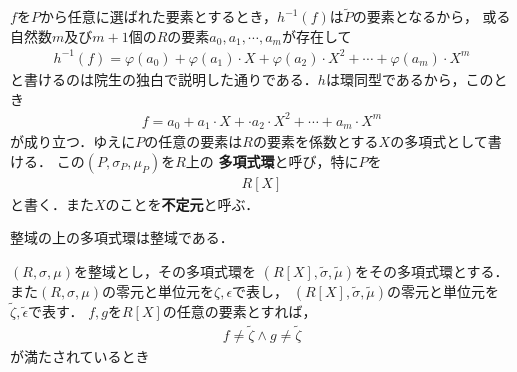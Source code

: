 	$f$を$P$から任意に選ばれた要素とするとき，$h^{-1}(f)$は$\tilde{P}$の要素となるから，
	或る自然数$m$及び$m+1$個の$R$の要素$a_0,a_1,\cdots,a_m$が存在して
	\begin{align}
		h^{-1}(f) = \varphi(a_0) + \varphi(a_1) \cdot X + \varphi(a_2) \cdot X^2 + \cdots + \varphi(a_m) \cdot X^m
	\end{align}
	と書けるのは院生の独白で説明した通りである．$h$は環同型であるから，このとき
	\begin{align}
		f = a_0 + a_1 \cdot X + \cdot a_2 \cdot X^2 + \cdots + a_m \cdot X^m
	\end{align}
	が成り立つ．ゆえに$P$の任意の要素は$R$の要素を係数とする$X$の多項式として書ける．
	この$(P,\sigma_P,\mu_P)$を$R$上の
	{\bf 多項式環}と呼び，特に$P$を
	\begin{align}
		R[X]
	\end{align}
	と書く．また$X$のことを{\bf 不定元}と呼ぶ．
	
	
	\begin{screen}
		\begin{thm}[整域上の多項式環は整域]
			整域の上の多項式環は整域である．
		\end{thm}
	\end{screen}
	
	\begin{prf}
		$(R,\sigma,\mu)$を整域とし，その多項式環を
		$\left( R[X],\tilde{\sigma},\tilde{\mu} \right)$をその多項式環とする．
		また$(R,\sigma,\mu)$の零元と単位元を$\zeta,\epsilon$で表し，
		$\left( R[X],\tilde{\sigma},\tilde{\mu} \right)$の零元と単位元を
		$\tilde{\zeta},\tilde{\epsilon}$で表す．
		$f,g$を$R[X]$の任意の要素とすれば，
		\begin{align}
			f \neq \tilde{\zeta} \wedge g \neq \tilde{\zeta}
		\end{align}
		が満たされているとき
		
		
	\end{prf}
	
	\begin{screen}
		\begin{thm}[体の上の多項式環はEuclid整域]
		\end{thm}
	\end{screen}
	
	\begin{screen}
		\begin{thm}[Euclid整域は単項イデアル整域]
		\end{thm}
	\end{screen}